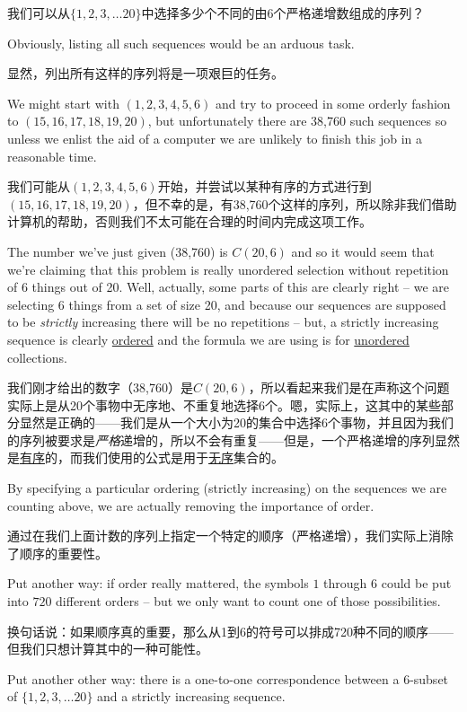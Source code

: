 我们可以从$\{1, 2, 3, \ldots 20\}$中选择多少个不同的由6个严格递增数组成的序列？

Obviously, listing all such sequences would be an arduous task.

显然，列出所有这样的序列将是一项艰巨的任务。

We might start with $(1,2,3,4,5,6)$ and try to proceed in some 
orderly fashion to $(15,16,17,18,19,20)$, but unfortunately there
are 38,760 such sequences so unless we enlist the aid of a computer
we are unlikely to finish this job in a reasonable time.

我们可能从$(1,2,3,4,5,6)$开始，并尝试以某种有序的方式进行到$(15,16,17,18,19,20)$，但不幸的是，有38,760个这样的序列，所以除非我们借助计算机的帮助，否则我们不太可能在合理的时间内完成这项工作。

The number
we've just given (38,760) is $C(20,6)$ and so it would seem that we're
claiming that this problem is really unordered selection without repetition
of 6 things out of 20.   Well, actually, some parts of this are clearly
right -- we are selecting 6 things from a set of size 20, and because
our sequences are supposed to be \emph{strictly} increasing there will 
be no repetitions -- but, a strictly increasing sequence is clearly 
\underline{ordered} and the formula we are using is for \underline{unordered}
collections.

我们刚才给出的数字（38,760）是$C(20,6)$，所以看起来我们是在声称这个问题实际上是从20个事物中无序地、不重复地选择6个。嗯，实际上，这其中的某些部分显然是正确的——我们是从一个大小为20的集合中选择6个事物，并且因为我们的序列被要求是\emph{严格}递增的，所以不会有重复——但是，一个严格递增的序列显然是\underline{有序}的，而我们使用的公式是用于\underline{无序}集合的。

By specifying a particular ordering (strictly increasing) on the sequences 
we are counting above, we are actually removing the importance of order.

通过在我们上面计数的序列上指定一个特定的顺序（严格递增），我们实际上消除了顺序的重要性。

Put another way: if order really mattered, the symbols $1$ through $6$
could be put into $720$ different orders -- but we only want to count 
one of those possibilities.

换句话说：如果顺序真的重要，那么从1到6的符号可以排成720种不同的顺序——但我们只想计算其中的一种可能性。

Put another other way: there is a one-to-one
correspondence between a $6$-subset of $\{1,2,3, \ldots 20\}$ and a
strictly increasing sequence.

